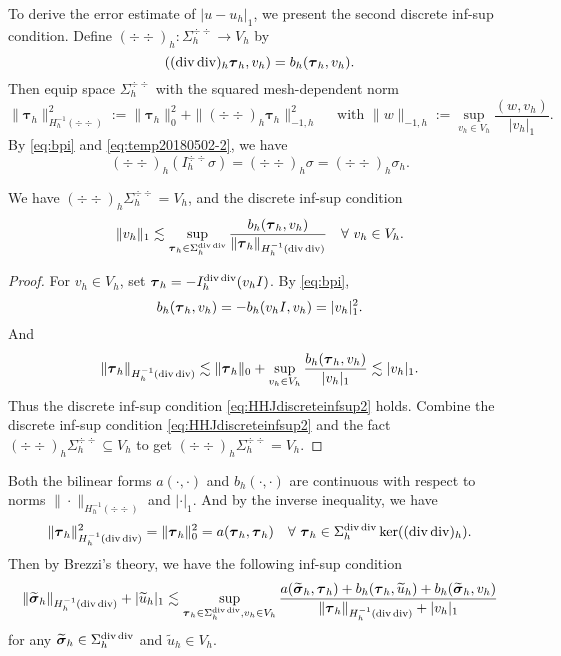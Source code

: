 To derive the error estimate of $|u-u_h|_{1}$, we present the second discrete inf-sup condition. Define $(\div\div)_h:\Sigma_h^{\div\div}\to V_h$ by
$$
((\operatorname{div}\operatorname{div})_h\boldsymbol{\tau}_h, v_h)=b_h(\boldsymbol\tau_h, v_h).
$$
Then equip space $\Sigma_h^{\div\div}$ with the squared mesh-dependent norm
$$
\|\boldsymbol{\tau}_h\|_{H_h^{-1}(\div\div)}^2:=\|\boldsymbol{\tau}_h\|_{0}^2+ \|(\div\div)_h\boldsymbol{\tau}_h\|_{-1,h}^2\quad\textrm{ with } \|w\|_{-1,h}:=\sup_{v_h\in V_h}\frac{(w, v_h)}{|v_h|_1}.
$$
By \eqref{eq:bpi} and \eqref{eq:temp20180502-2}, we have
$$
(\div\div)_h(I_h^{\div\div}\sigma)=(\div\div)_h\sigma=(\div\div)_h\sigma_h.
$$

\begin{lemma}
We have $(\div\div)_h\Sigma_h^{\div\div}=V_h$, and
the discrete inf-sup condition
\begin{equation}\label{eq:HHJdiscreteinfsup2}
\|v_h\|_{1}\lesssim \sup_{\boldsymbol\tau_h\in\Sigma_h^{\operatorname{div}\operatorname{div}}}\frac{b_h(\boldsymbol\tau_h, v_h)}{\|\boldsymbol\tau_h\|_{H_h^{-1}(\operatorname{div}\operatorname{div})}}\quad\forall~v_h\in V_h.
\end{equation}
\end{lemma}
\begin{proof}
For $v_h\in V_h$, set $\boldsymbol\tau_h=-I_h^{\operatorname{div}\operatorname{div}}(v_hI)$. By \eqref{eq:bpi},
$$
b_h(\boldsymbol\tau_h, v_h)=-b_h(v_hI, v_h)=|v_h|_1^2.
$$
And
$$
\|\boldsymbol{\tau}_h\|_{H_h^{-1}(\operatorname{div}\operatorname{div})}\lesssim\|\boldsymbol{\tau}_h\|_{0}+  \sup_{v_h\in V_h}\frac{b_h(\boldsymbol\tau_h, v_h)}{|v_h|_1}\lesssim |v_h|_1.
$$
Thus the discrete inf-sup condition \eqref{eq:HHJdiscreteinfsup2} holds. Combine the discrete inf-sup condition \eqref{eq:HHJdiscreteinfsup2} and the fact $(\div\div)_h\Sigma_h^{\div\div}\subseteq V_h$ to get $(\div\div)_h\Sigma_h^{\div\div}=V_h$.
\end{proof}

Both the bilinear forms $a(\cdot, \cdot)$ and $b_h(\cdot, \cdot)$ are continuous with respect to norms $\|\cdot\|_{H_h^{-1}(\div\div)}$ and $|\cdot|_{1}$. And by the inverse inequality, we have
\[
\|\boldsymbol\tau_h\|_{H_h^{-1}(\operatorname{div}\operatorname{div})}^2=\|\boldsymbol\tau_h\|_0^2=a(\boldsymbol\tau_h,\boldsymbol\tau_h)\quad\forall~\boldsymbol\tau_h\in\Sigma_h^{\operatorname{div}\operatorname{div}}\ker((\operatorname{div}\operatorname{div})_h).
\]
Then
by Brezzi's theory, we have the following inf-sup condition
\begin{equation}\label{eq:HHJinfsup3}
\|\widetilde{\boldsymbol\sigma}_h\|_{H_h^{-1}(\operatorname{div}\operatorname{div})}+|\widetilde{u}_h|_{1}\lesssim \sup_{\boldsymbol\tau_h\in\Sigma_h^{\operatorname{div}\operatorname{div}}, v_h\in V_h}\frac{a(\widetilde{\boldsymbol\sigma}_h, \boldsymbol\tau_h)+ b_h(\boldsymbol\tau_h, \widetilde{u}_h)+b_h(\widetilde{\boldsymbol\sigma}_h, v_h)}{\|\boldsymbol\tau_h\|_{H_h^{-1}(\operatorname{div}\operatorname{div})}+|v_h|_{1}}
\end{equation}
for any $\widetilde{\boldsymbol\sigma}_h\in\Sigma_h^{\operatorname{div}\operatorname{div}}$ and $\widetilde{u}_h\in V_h$.


